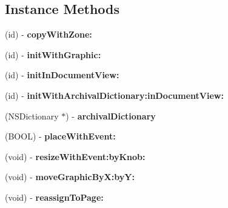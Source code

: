 \subsection*{Instance Methods}
\begin{DoxyCompactItemize}
\item 
\mbox{\label{interface_f_p_graphic_ae12bedb945293ea59c73f330563e745a}} 
(id) -\/ {\bfseries copy\+With\+Zone\+:}
\item 
\mbox{\label{interface_f_p_graphic_a80be4a01075f1e756e2e9477247c647e}} 
(id) -\/ {\bfseries init\+With\+Graphic\+:}
\item 
\mbox{\label{interface_f_p_graphic_a45910851012e7123f450d7cc40af79dd}} 
(id) -\/ {\bfseries init\+In\+Document\+View\+:}
\item 
\mbox{\label{interface_f_p_graphic_ab0895eeb5bfbd7484430089c3ef7b1cf}} 
(id) -\/ {\bfseries init\+With\+Archival\+Dictionary\+:in\+Document\+View\+:}
\item 
\mbox{\label{interface_f_p_graphic_a7a8deb5569f6c31d7da9b9e793dc41f5}} 
(N\+S\+Dictionary $\ast$) -\/ {\bfseries archival\+Dictionary}
\item 
\mbox{\label{interface_f_p_graphic_a4f61a0dd58d2f1e686f0a1f18af931bf}} 
(B\+O\+OL) -\/ {\bfseries place\+With\+Event\+:}
\item 
\mbox{\label{interface_f_p_graphic_a5f8880f5733f68ac65edd53b4b9164cd}} 
(void) -\/ {\bfseries resize\+With\+Event\+:by\+Knob\+:}
\item 
\mbox{\label{interface_f_p_graphic_a0d5337c0224cbfb5fbcf2d3d87089d60}} 
(void) -\/ {\bfseries move\+Graphic\+By\+X\+:by\+Y\+:}
\item 
\mbox{\label{interface_f_p_graphic_a1824b1087b3683653179b0c9d778a4b2}} 
(void) -\/ {\bfseries reassign\+To\+Page\+:}
\item 
\mbox{\label{interface_f_p_graphic_aca90e4ba9329c2d7ab1203ac7222eab5}} 

\end{DoxyCompactItemize}
